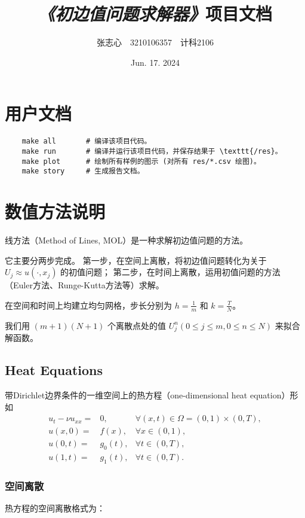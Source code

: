 \documentclass[lang=cn,a4paper,newtx,bibend=bibtex]{elegantpaper}
\title{\emph{《初边值问题求解器》}项目文档}
\author{张志心~~3210106357~~计科2106}
\date{Jun. 17. 2024}
\begin{document}
\maketitle

\tableofcontents
\newpage

\section{用户文档}

\begin{verbatim}
    make all       # 编译该项目代码。
    make run       # 编译并运行该项目代码，并保存结果于 \texttt{/res}。
    make plot      # 绘制所有样例的图示 (对所有 res/*.csv 绘图)。
    make story     # 生成报告文档。
\end{verbatim}

\newpage
\section{数值方法说明}

线方法（Method of Lines, MOL）是一种求解初边值问题的方法。

它主要分两步完成。
第一步，在空间上离散，将初边值问题转化为关于 $U_j \approx u(\cdot,x_j)$ 的初值问题；
第二步，在时间上离散，运用初值问题的方法（Euler方法、Runge-Kutta方法等）求解。

在空间和时间上均建立均匀网格，步长分别为 $h=\frac 1m$ 和 $k=\frac TN$。

我们用 $(m+1)(N+1)$ 个离散点处的值 $U_j^n(0\leq j\leq m, 0\leq n\leq N)$ 来拟合解函数。

\subsection{Heat Equations}

带Dirichlet边界条件的一维空间上的热方程（one-dimensional heat equation）形如
\begin{eqnarray}
    u_t - \nu u_{xx} = & 0, & \forall (x,t)\in \Omega = (0,1)\times (0,T), \\
    u(x,0) = & f(x), & \forall x\in (0,1), \\
    u(0,t) = & g_0(t), & \forall t\in (0,T), \\
    u(1,t) = & g_1(t), & \forall t\in (0,T).
\end{eqnarray}

\subsubsection{空间离散}
热方程的空间离散格式为：
\end{document}
